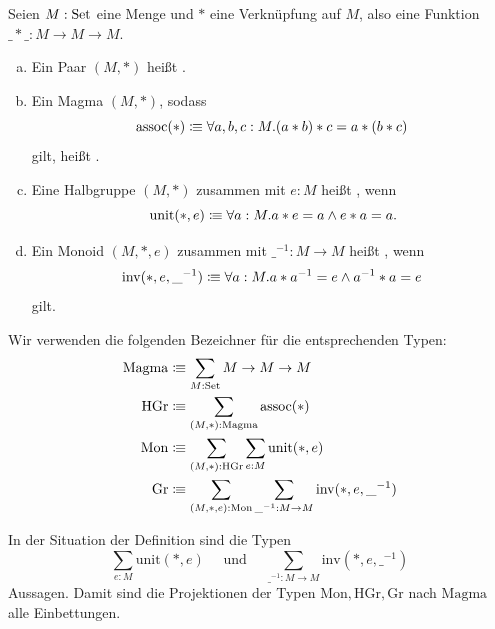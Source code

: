 \begin{definition}
  Seien $M:\mathrm{Set}$ eine Menge und $\ast$ eine Verknüpfung auf $M$, also eine Funktion $\_\ast\_:M\to M\to M$.
  \begin{enumerate}[(a)]
  \item Ein Paar $(M,\ast)$ heißt .
  \item Ein Magma $(M,\ast)$, sodass
    \[
    \mathrm{assoc}(\ast)\vcentcolon\mspace{-1.2mu}\equiv \forall a,b,c:M.(a\ast b)\ast c=a\ast (b\ast c)
    \]
    gilt, heißt .
  \item Eine Halbgruppe $(M,\ast)$ zusammen mit $e:M$ heißt ,
    wenn
    \[
      \mathrm{unit}(\ast,e)\colonequiv \forall a:M.a\ast e=a\wedge e\ast a=a\rlap{.}
    \]
  \item Ein Monoid $(M,\ast,e)$ zusammen mit $\_^{-1}:M\to M$ heißt ,
    wenn
    \[
      \mathrm{inv}(\ast,e,\_^{-1})\vcentcolon\mspace{-1.2mu}\equiv \forall a:M.a\ast a^{-1}=e\wedge a^{-1}\ast a=e
      \]
      gilt.
  \end{enumerate}
  Wir verwenden die folgenden Bezeichner für die entsprechenden Typen:
  \begin{align*}
    \mathrm{Magma}&\vcentcolon\mspace{-1.2mu}\equiv \sum_{M:\mathrm{Set}}M\to M\to M \\
    \mathrm{HGr}&\vcentcolon\mspace{-1.2mu}\equiv \sum_{(M,\ast):\mathrm{Magma}}\mathrm{assoc}(\ast)\\
    \mathrm{Mon}&\vcentcolon\mspace{-1.2mu}\equiv \sum_{(M,\ast):\mathrm{HGr}}\sum_{e:M}\mathrm{unit}(\ast,e) \\
    \mathrm{Gr}&\vcentcolon\mspace{-1.2mu}\equiv \sum_{(M,\ast,e):\mathrm{Mon}}\sum_{\_^{-1}:M\to M}\mathrm{inv}(\ast,e,\_^{-1})
  \end{align*}    
\end{definition}

\begin{bemerkung}
  \label{monoid-hgruppe-gruppe-aussagen}
  In der Situation der Definition sind die Typen
  \[
     \sum_{e:M}\mathrm{unit}(\ast,e)\quad \text{ und }\quad \sum_{\_^{-1}:M\to M}\mathrm{inv}(\ast,e,\_^{-1})
     \]
     Aussagen.
     Damit sind die Projektionen der Typen $\mathrm{Mon},\mathrm{HGr},\mathrm{Gr}$ nach $\mathrm{Magma}$ alle Einbettungen.
\end{bemerkung}

